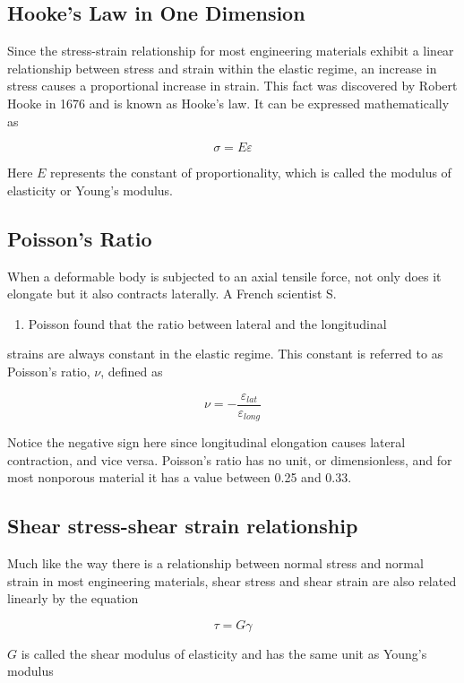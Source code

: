 \documentclass[a4paper,openany,12pt]{book}
\begin{document}
\subsection{Hooke's Law in One Dimension}
\label{hookes-law-in-one-dimension}
Since the stress-strain relationship for most engineering materials
exhibit a linear relationship between stress and strain within the
elastic regime, an increase in stress causes a proportional increase in
strain. This fact was discovered by Robert Hooke in 1676 and is known as
Hooke's law. It can be expressed mathematically as

$$\sigma  = E\varepsilon$$

Here \(E\) represents the constant of proportionality, which is called the
modulus of elasticity or Young's modulus.

\subsection{Poisson's Ratio}
\label{poissons-ratio}
When a deformable body is subjected to an axial tensile force, not only
does it elongate but it also contracts laterally. A French scientist S.
\begin{enumerate}
\item Poisson found that the ratio between lateral and the longitudinal
\end{enumerate}
strains are always constant in the elastic regime. This constant is
referred to as Poisson's ratio, \(\nu\), defined as


$$\nu  =  - \frac{\varepsilon _{lat}}{\varepsilon _{long}}$$

Notice the negative sign here since longitudinal elongation causes
lateral contraction, and vice versa. Poisson's ratio has no unit, or
dimensionless, and for most nonporous material it has a value between
0.25 and 0.33.

\subsection{Shear stress-shear strain relationship}
\label{shear-stress-shear-strain-relationship}
Much like the way there is a relationship between normal stress and
normal strain in most engineering materials, shear stress and shear
strain are also related linearly by the equation

$$\tau  = G\gamma$$

\(G\) is called the shear modulus of elasticity and has the same unit as
Young's modulus
\end{document}
